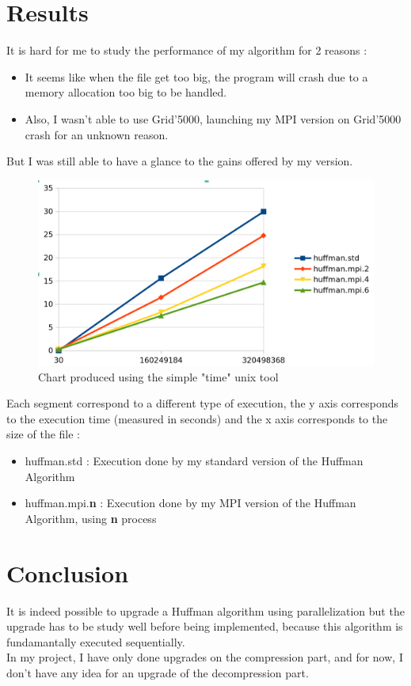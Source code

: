 \section{Results}
It is hard for me to study the performance of my algorithm for 2 reasons :
\begin{itemize}
	\item It seems like when the file get too big, the program will crash due to a memory allocation too big to be handled.
	\item Also, I wasn't able to use Grid'5000, launching my MPI version on Grid'5000 crash for an unknown reason.
\end{itemize}
But I was still able to have a glance to the gains offered by my version.\\
\begin{figure}[H]
    \centering
    \includegraphics[scale=0.8]{img/chart.png}
    \caption{Chart produced using the simple "time" unix tool}
    \label{fig:my_label}
\end{figure}
Each segment correspond to a different type of execution, the y axis corresponds to the execution time (measured in seconds) and the x axis corresponds to the size of the file :
\begin{itemize}
	\item huffman.std : Execution done by my standard version of the Huffman Algorithm
	\item huffman.mpi.\textbf{n} : Execution done by my MPI version of the Huffman Algorithm, using \textbf{n} process
\end{itemize}

\section{Conclusion}
It is indeed possible to upgrade a Huffman algorithm using parallelization but the upgrade has to be study well before being implemented, because this algorithm is fundamantally executed sequentially.\\
In my project, I have only done upgrades on the compression part, and for now, I don't have any idea for an upgrade of the decompression part.